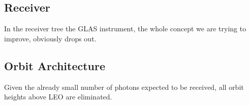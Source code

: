 \subsection{Receiver}
In the receiver tree the \ac{GLAS} instrument, the whole concept we are trying to improve, obviously drops out.

\subsection{Orbit Architecture}
Given the already small number of photons expected to be received, all orbit heights above \ac{LEO} are eliminated. 



